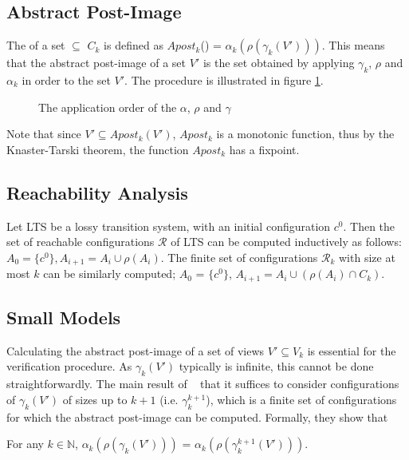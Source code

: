 \subsection{Abstract Post-Image}
The  of a set  $\subseteq$ $C_k$ is defined as $Apost_k$() = $\alpha_k(\rho(\gamma_k(V')))$. This means that the abstract post-image of a set $V'$ is the set obtained by applying $\gamma_k$, $\rho$ and $\alpha_k$ in order to the set $V'$. The procedure is illustrated in figure \ref{apost}.
\begin{figure}
\abstraction
\caption{The application order of the $\alpha$, $\rho$ and $\gamma$}
\label{apost}
\end{figure}

Note that since $V' \subseteq Apost_k(V')$, $Apost_k$ is a monotonic function, thus by the Knaster-Tarski theorem, the function $Apost_k$ has a fixpoint.

\subsection{Reachability Analysis}
\label{reachcompute}
Let LTS be a lossy transition system, with an initial configuration $c^0$. Then the set of reachable configurations $\mathcal{R}$ of LTS can be computed inductively as follows: $A_0 = \{c^0\}, A_{i+1}= A_i \cup \rho(A_i)$. The finite set of configurations $\mathcal{R}_k$ with size at most $k$ can be similarly computed; $A_0$ = $\{c^0\}$, $A_{i+1} = A_i \cup (\rho(A_i) \cap C_k)$.

\subsection{Small Models}
\label{proof}
Calculating the abstract post-image of a set of views $V' \subseteq V_k$ is essential for the verification procedure. As $\gamma_k(V')$ typically is infinite, this cannot be done straightforwardly. The main result of ~\cite{parosh} that it suffices to consider configurations of $\gamma_k(V')$ of sizes up to $k+1$ (i.e. $\gamma_k^{k+1}$), which is a finite set of configurations for which the abstract post-image can be computed. Formally, they show that

\begin{lemma}
\label{lemma1}
For any $k\in\mathbb{N}$, $\alpha_k(\rho(\gamma_k(V')))$ = $\alpha_k(\rho(\gamma_k^{k+1}(V')))$.
\end{lemma}

